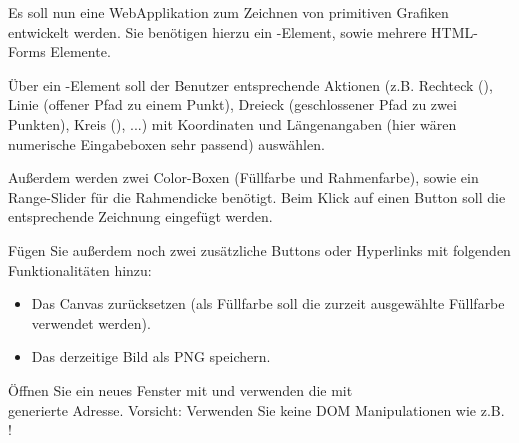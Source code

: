 %
\par Es soll nun eine WebApplikation zum Zeichnen von primitiven Grafiken
entwickelt werden. Sie benötigen hierzu ein -Element, sowie
mehrere HTML-Forms Elemente.
%
\par Über ein -Element soll der Benutzer entsprechende Aktionen
(z.B. Rechteck (), Linie (offener Pfad zu einem Punkt), Dreieck
(geschlossener Pfad zu zwei Punkten), Kreis (), ...) mit Koordinaten
und Längenangaben (hier wären numerische Eingabeboxen sehr passend) auswählen.
%
\par Außerdem werden zwei Color-Boxen (Füllfarbe und Rahmenfarbe), sowie ein
Range-Slider für die Rahmendicke benötigt. Beim Klick auf einen Button soll die
entsprechende Zeichnung eingefügt werden.
%
\par Fügen Sie außerdem noch zwei zusätzliche Buttons oder Hyperlinks mit
folgenden Funktionalitäten hinzu:
%
\begin{itemize}
\item
Das Canvas zurücksetzen (als Füllfarbe soll die zurzeit ausgewählte Füllfarbe
verwendet werden).
\item
Das derzeitige Bild als PNG speichern.
\end{itemize}
%
%
\par Öffnen Sie ein neues Fenster mit  und verwenden die mit\\ generierte Adresse. Vorsicht: Verwenden Sie keine
DOM Manipulationen wie z.B. !